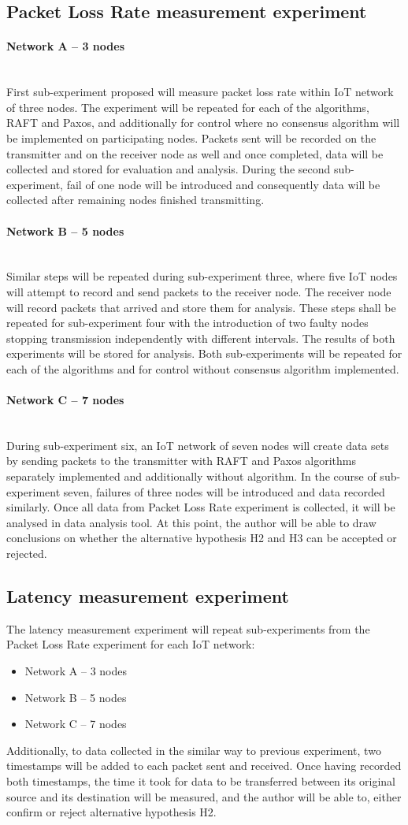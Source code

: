 \documentclass[oneside,12pt]{book}
\newcommand{\myparagraph}[1]{\paragraph{#1}\mbox{}\\}
\begin{document}
\subsection{Packet Loss Rate measurement experiment}
\myparagraph{Network A – 3 nodes}
First sub-experiment proposed will measure packet loss rate within IoT network of three nodes. The experiment will be repeated for each of the algorithms, RAFT and Paxos, and additionally for control where no consensus algorithm will be implemented on participating nodes. Packets sent will be recorded on the transmitter and on the receiver node as well and once completed, data will be collected and stored for evaluation and analysis. During the second sub-experiment, fail of one node will be introduced and consequently data will be collected after remaining nodes finished transmitting. 
\myparagraph{Network B – 5 nodes}
Similar steps will be repeated during sub-experiment three, where five IoT nodes will attempt to record and send packets to the receiver node.  The receiver node will record packets that arrived and store them for analysis. These steps shall be repeated for sub-experiment four with the introduction of two faulty nodes stopping transmission independently with different intervals. The results of both experiments will be stored for analysis. Both sub-experiments will be repeated for each of the algorithms and for control without consensus algorithm implemented.
\myparagraph{Network C – 7 nodes}
During sub-experiment six, an IoT network of seven nodes will create data sets by sending packets to the transmitter with RAFT and Paxos algorithms separately implemented and additionally without algorithm. In the course of sub-experiment seven, failures of three nodes will be introduced and data recorded similarly.
Once all data from Packet Loss Rate experiment is collected, it will be analysed in data analysis tool. At this point, the author will be able to draw conclusions on whether the alternative hypothesis H2 and H3 can be accepted or rejected.
\subsection{Latency measurement experiment}
The latency measurement experiment will repeat sub-experiments from the Packet Loss Rate experiment for each IoT network:
\begin{itemize}
  \item Network A – 3 nodes
  \item Network B – 5 nodes
  \item Network C – 7 nodes
\end{itemize}
Additionally, to data collected in the similar way to previous experiment, two timestamps will be added to each packet sent and received. Once having recorded both timestamps, the time it took for data to be transferred between its original source and its destination will be measured, and the author will be able to, either confirm or reject alternative hypothesis H2.
\end{document}
